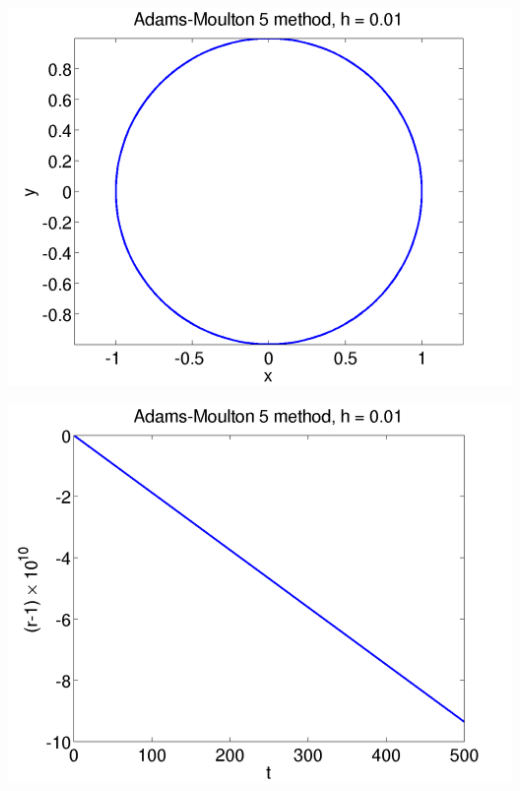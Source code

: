 \documentclass{beamer}
\begin{document}
\begin{frame}
\begin{columns}
\begin{column}{0.5\textwidth}
\begin{overlayarea}{\textwidth}{0.6\textheight}
{\begin{center}
          \end{center}
        }
        {
          \begin{center}
            \includegraphics[height=0.5\textheight]{figures/AM5_2}
          \end{center}
        }
        {
          \begin{center}
            \includegraphics[height=0.5\textheight]{figures/AM5_rad2}
          \end{center}
        }
      \end{overlayarea}
    \end{column}
  \end{columns}

\end{frame}
\end{document}
